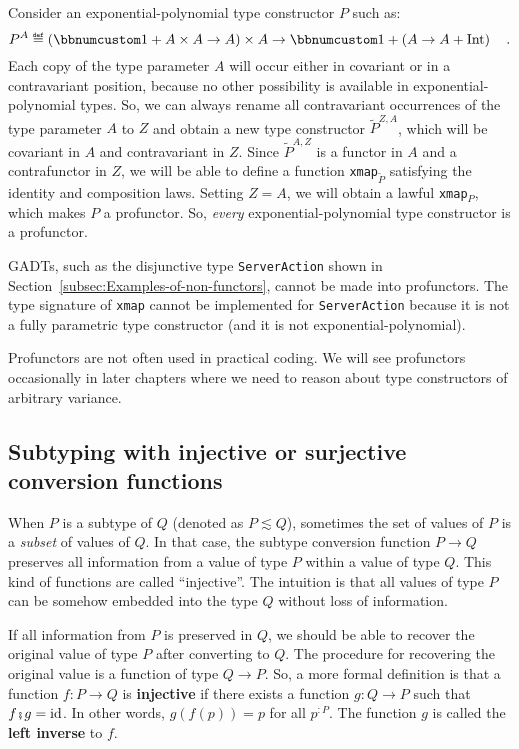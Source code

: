 Consider an exponential-polynomial type constructor $P$ such as:
\[
P^{A}\triangleq\left(\bbnum 1+A\times A\rightarrow A\right)\times A\rightarrow\bbnum 1+\left(A\rightarrow A+\text{Int}\right)\quad.
\]
Each copy of the type parameter $A$ will occur either in covariant
or in a contravariant position, because no other possibility is available
in exponential-polynomial types. So, we can always rename all contravariant
occurrences of the type parameter $A$ to $Z$ and obtain a new type
constructor $\tilde{P}^{Z,A}$, which will be covariant in $A$ and
contravariant in $Z$. Since $\tilde{P}^{A,Z}$ is a functor in $A$
and a contrafunctor in $Z$, we will be able to define a function
\lstinline!xmap!$_{\tilde{P}}$ satisfying the identity and composition
laws. Setting $Z=A$, we will obtain a lawful \lstinline!xmap!$_{P}$,
which makes $P$ a profunctor. So, \emph{every} exponential-polynomial
type constructor is a profunctor.

GADTs, such as the disjunctive type \lstinline!ServerAction!
shown in Section~\ref{subsec:Examples-of-non-functors}, cannot be
made into profunctors. The type signature of \lstinline!xmap! cannot
be implemented for \lstinline!ServerAction! because it is not a fully
parametric type constructor (and it is not exponential-polynomial).

Profunctors are not often used in practical coding. We will see profunctors
occasionally in later chapters where we need to reason about type
constructors of arbitrary variance.

\subsection{Subtyping with injective or surjective conversion functions\label{subsec:Subtyping-with-injective}}

When $P$ is a subtype of $Q$ (denoted as $P\lesssim Q$), sometimes
the set of values of $P$ is a \emph{subset} of values of $Q$. In
that case, the subtype conversion function
$P\rightarrow Q$ preserves all information from a value of type $P$
within a value of type $Q$. This kind of functions are called \textsf{``}injective\textsf{''}.
The intuition is that all values of type $P$ can be somehow embedded
into the type $Q$ without loss of information.

If all information from $P$ is preserved in $Q$, we should be able
to recover the original value of type $P$ after converting to $Q$.
The procedure for recovering the original value is a function of type
$Q\rightarrow P$. So, a more formal definition is that a function
$f:P\rightarrow Q$ is \textbf{injective}
if there exists a function $g:Q\rightarrow P$ such that $f\bef g=\text{id}$.
In other words, $g(f(p))=p$ for all $p^{:P}$. The function $g$
is called the \textbf{left inverse} to $f$. 

